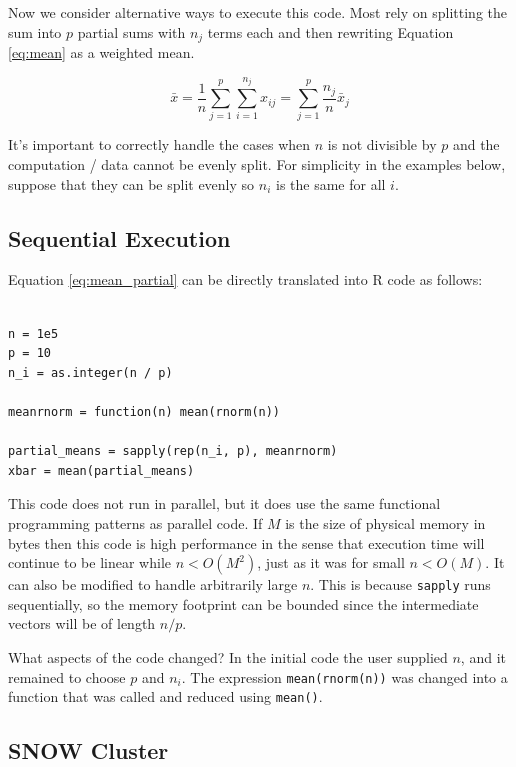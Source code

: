 \documentclass[12pt]{article}
\begin{document}
Now we consider alternative ways to execute this code.  Most rely on
splitting the sum into $p$ partial sums with $n_j$ terms each and then rewriting
Equation \ref{eq:mean} as a weighted mean.

\begin{equation}
    \bar{x} = \frac{1}{n} \sum_{j = 1}^p \sum_{i = 1}^{n_j} x_{ij}
    = \sum_{j = 1}^p \frac{n_j}{n} \bar{x}_j
\label{eq:mean_partial}
\end{equation}

It's important to correctly handle the cases when $n$ is not divisible by $p$
and the computation / data cannot be evenly split. For simplicity in the
examples below, suppose that they can be split evenly so $n_i$ is the same
for all $i$.

\subsection{Sequential Execution}
\label{section:sequential}

Equation \ref{eq:mean_partial} can be directly translated into R code as
follows:

\begin{verbatim}

n = 1e5
p = 10
n_i = as.integer(n / p)

meanrnorm = function(n) mean(rnorm(n))

partial_means = sapply(rep(n_i, p), meanrnorm)
xbar = mean(partial_means)
\end{verbatim}

This code does not run in parallel, but it does use the same functional
programming patterns as parallel code. If $M$ is the size of physical memory in
bytes then this code is high performance in the sense
that execution time will continue to be linear while $n < O(M^2)$, just
as it was for small $n < O(M)$. It can also be modified to handle
arbitrarily large $n$. This is because \texttt{sapply} runs
sequentially, so the memory footprint can be bounded since the intermediate
vectors will be of length $n / p$. 

What aspects of the code changed? In the initial code the user
supplied $n$, and it remained to choose $p$ and $n_i$.
The expression \texttt{mean(rnorm(n))} was changed into a function that was
called and reduced using \texttt{mean()}.

\subsection{SNOW Cluster}
\end{document}
